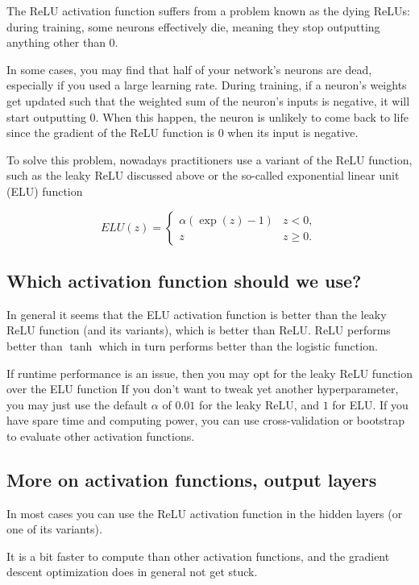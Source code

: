 \documentclass[%
oneside,                 %
final,                   %
10pt]{article}
\begin{document}
The ReLU activation function suffers from a problem known as the dying
ReLUs: during training, some neurons effectively die, meaning they
stop outputting anything other than 0.

In some cases, you may find that half of your network’s neurons are
dead, especially if you used a large learning rate. During training,
if a neuron’s weights get updated such that the weighted sum of the
neuron’s inputs is negative, it will start outputting 0. When this
happen, the neuron is unlikely to come back to life since the gradient
of the ReLU function is 0 when its input is negative.

To solve this problem, nowadays practitioners use a variant of the
ReLU function, such as the leaky ReLU discussed above or the so-called
exponential linear unit (ELU) function

\[
ELU(z) = \left\{\begin{array}{cc} \alpha\left( \exp{(z)}-1\right) & z < 0,\\  z & z \ge 0.\end{array}\right. 
\]

\subsection{Which activation function should we use?}

In general it seems that the ELU activation function is better than
the leaky ReLU function (and its variants), which is better than
ReLU. ReLU performs better than $\tanh$ which in turn performs better
than the logistic function.

If runtime performance is an issue, then you may opt for the leaky
ReLU function over the ELU function If you don’t want to tweak yet
another hyperparameter, you may just use the default $\alpha$ of
$0.01$ for the leaky ReLU, and $1$ for ELU. If you have spare time and
computing power, you can use cross-validation or bootstrap to evaluate
other activation functions.

\subsection{More on activation functions, output layers}

In most cases you can use the ReLU activation function in the hidden
layers (or one of its variants).

It is a bit faster to compute than other activation functions, and the
gradient descent optimization does in general not get stuck.
\end{document}
